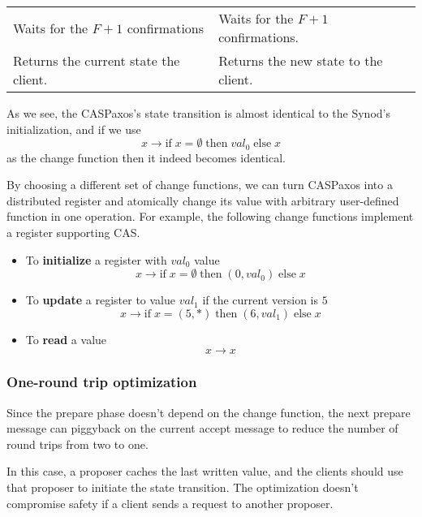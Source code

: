 \documentclass[a4paper,USenglish]{lipics-v2018}
\theoremstyle{definition}
\begin{document}
\begin{center}
\begin{longtable}{p{15em}|p{15em}}
        
        Waits for the $F+1$ confirmations
        &
        Waits for the $F+1$ confirmations. \\[6pt]
        
        
        Returns the current state the client.
        &
        Returns the new state to the client. \\[6pt]
        
        \hline
    \end{longtable}
\end{center}

As we see, the CASPaxos's state transition is almost identical to the Synod's initialization, and if we use
$$x \to \mbox{if}\; x = \emptyset \;\mbox{then}\; val_0\; \mbox{else}\; x$$
as the change function then it indeed becomes identical.

By choosing a different set of change functions, we can turn CASPaxos into a distributed register and atomically change its value with arbitrary user-defined function in one operation. For example, the following change functions implement a register supporting CAS.

\begin{itemize}
    \item To {\bf initialize} a register with $val_0$ value
    $$x \to \mbox{if}\; x = \emptyset \;\mbox{then}\; (0, val_0)\; \mbox{else}\; x$$
    
    \item To {\bf update} a register to value $val_1$ if the current version is $5$
    $$x \to \mbox{if}\; x = (5, \ast) \;\mbox{then}\; (6, val_1)\; \mbox{else}\; x$$
    
    \item To {\bf read} a value
    $$x \to x$$
\end{itemize}

\subsubsection{One-round trip optimization}\label{1rtt}

Since the prepare phase doesn't depend on the change function, the next prepare message can piggyback on the current accept message to reduce the number of round trips from two to one.

In this case, a proposer caches the last written value, and the clients should use that proposer to initiate the state transition. The optimization doesn't compromise safety if a client sends a request to another proposer.
\end{document}
